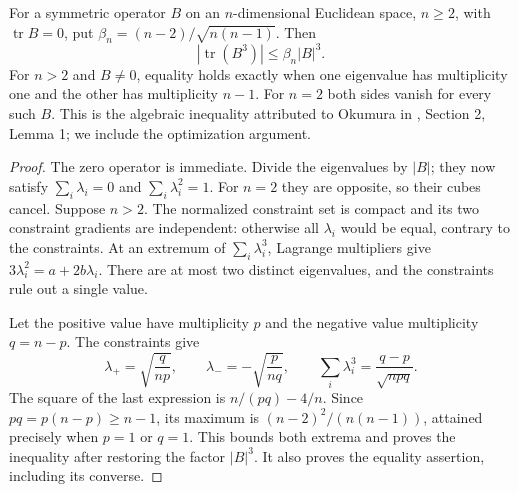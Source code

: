 \begin{lemma}\label{lem:tracefree-cubic-bound}
For a symmetric operator $B$ on an $n$-dimensional Euclidean space, $n\geq2$, with $\operatorname{tr}B=0$, put $\beta_n=(n-2)/\sqrt{n(n-1)}$. Then
\[
 |\operatorname{tr}(B^3)|\leq\beta_n|B|^3.
\]
For $n>2$ and $B\ne0$, equality holds exactly when one eigenvalue has multiplicity one and the other has multiplicity $n-1$. For $n=2$ both sides vanish for every such $B$. This is the algebraic inequality attributed to Okumura in \cite{AdC94}, Section 2, Lemma 1; we include the optimization argument.
\end{lemma}
\begin{proof}
The zero operator is immediate. Divide the eigenvalues by $|B|$; they now satisfy $\sum_i\lambda_i=0$ and $\sum_i\lambda_i^2=1$. For $n=2$ they are opposite, so their cubes cancel. Suppose $n>2$. The normalized constraint set is compact and its two constraint gradients are independent: otherwise all $\lambda_i$ would be equal, contrary to the constraints. At an extremum of $\sum_i\lambda_i^3$, Lagrange multipliers give $3\lambda_i^2=a+2b\lambda_i$. There are at most two distinct eigenvalues, and the constraints rule out a single value.

Let the positive value have multiplicity $p$ and the negative value multiplicity $q=n-p$. The constraints give
\[
 \lambda_+=\sqrt{\frac{q}{np}},\qquad
 \lambda_-=-\sqrt{\frac{p}{nq}},\qquad
 \sum_i\lambda_i^3=\frac{q-p}{\sqrt{npq}}.
\]
The square of the last expression is $n/(pq)-4/n$. Since $pq=p(n-p)\geq n-1$, its maximum is $(n-2)^2/(n(n-1))$, attained precisely when $p=1$ or $q=1$. This bounds both extrema and proves the inequality after restoring the factor $|B|^3$. It also proves the equality assertion, including its converse.
\end{proof}

